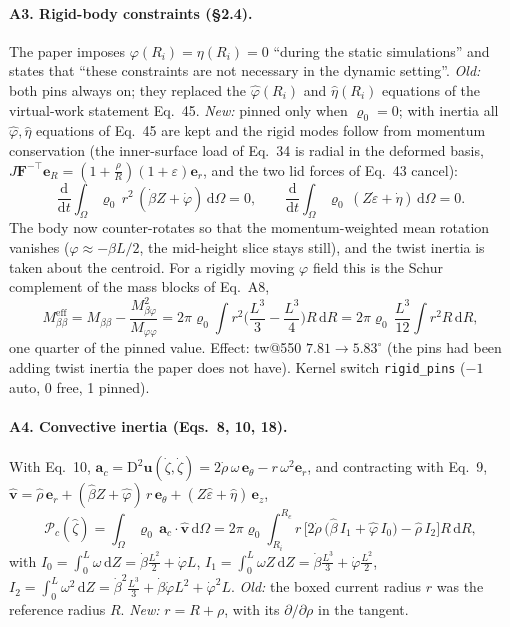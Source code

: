 \documentclass[10pt]{article}
\begin{document}
\paragraph{A3. Rigid-body constraints (\S2.4).} The paper imposes $\varphi(R_i)=\eta(R_i)=0$
``during the static simulations'' and states that ``these constraints are not necessary in the
dynamic setting''. \emph{Old:} both pins always on; they replaced the $\hat\varphi(R_i)$ and
$\hat\eta(R_i)$ equations of the virtual-work statement Eq.~45. \emph{New:} pinned only when
$\varrho_0=0$; with inertia all $\hat\varphi,\hat\eta$ equations of Eq.~45 are kept and the rigid
modes follow from momentum conservation (the inner-surface load of Eq.~34 is radial in the
deformed basis, $J\boldsymbol F^{-\top}\boldsymbol e_R=(1{+}\tfrac\rho R)(1{+}\varepsilon)\boldsymbol e_r$,
and the two lid forces of Eq.~43 cancel):
\begin{equation*}
\frac{\mathrm d}{\mathrm dt}\int_\Omega\varrho_0\,r^2\,(\dot\beta Z+\dot\varphi)\,\mathrm d\Omega=0,
\qquad
\frac{\mathrm d}{\mathrm dt}\int_\Omega\varrho_0\,(Z\dot\varepsilon+\dot\eta)\,\mathrm d\Omega=0 .
\end{equation*}
The body now counter-rotates so that the momentum-weighted mean rotation vanishes
($\varphi\approx-\beta L/2$, the mid-height slice stays still), and the twist inertia is taken
about the centroid. For a rigidly moving $\varphi$ field this is the Schur complement of the
mass blocks of Eq.~A8,
\begin{equation*}
M_{\beta\beta}^\text{eff}=M_{\beta\beta}-\frac{M_{\beta\varphi}^2}{M_{\varphi\varphi}}
=2\pi\varrho_0\!\int r^2\Big(\frac{L^3}{3}-\frac{L^3}{4}\Big)R\,\mathrm dR
=2\pi\varrho_0\,\frac{L^3}{12}\!\int r^2R\,\mathrm dR ,
\end{equation*}
one quarter of the pinned value. Effect: tw@550 $7.81\to5.83^\circ$ (the pins had been adding
twist inertia the paper does not have). Kernel switch \texttt{rigid\_pins} ($-1$ auto, 0 free,
1 pinned).

\paragraph{A4. Convective inertia (Eqs.~8, 10, 18).} With Eq.~10,
$\boldsymbol a_c=\mathrm D^2\boldsymbol u(\dot\zeta,\dot\zeta)=2\dot\rho\,\omega\,\boldsymbol e_\theta-r\,\omega^2\boldsymbol e_r$,
and contracting with Eq.~9,
$\hat{\boldsymbol v}=\hat\rho\,\boldsymbol e_r+(\hat\beta Z+\hat\varphi)\,r\,\boldsymbol e_\theta+(Z\hat\varepsilon+\hat\eta)\,\boldsymbol e_z$,
\begin{equation*}
\mathcal P_c(\hat\zeta)=\int_\Omega\varrho_0\,\boldsymbol a_c\cdot\hat{\boldsymbol v}\,\mathrm d\Omega
=2\pi\varrho_0\int_{R_i}^{R_e}\boxed{r}\,\Big[2\dot\rho\,\big(\hat\beta\,I_1+\hat\varphi\,I_0\big)-\hat\rho\,I_2\Big]R\,\mathrm dR,
\end{equation*}
with $I_0=\int_0^L\omega\,\mathrm dZ=\dot\beta\frac{L^2}{2}+\dot\varphi L$,
$I_1=\int_0^L\omega Z\,\mathrm dZ=\dot\beta\frac{L^3}{3}+\dot\varphi\frac{L^2}{2}$,
$I_2=\int_0^L\omega^2\,\mathrm dZ=\dot\beta^2\frac{L^3}{3}+\dot\beta\dot\varphi L^2+\dot\varphi^2L$.
\emph{Old:} the boxed current radius $r$ was the reference radius $R$. \emph{New:} $r=R+\rho$,
with its $\partial/\partial\rho$ in the tangent.
\end{document}
